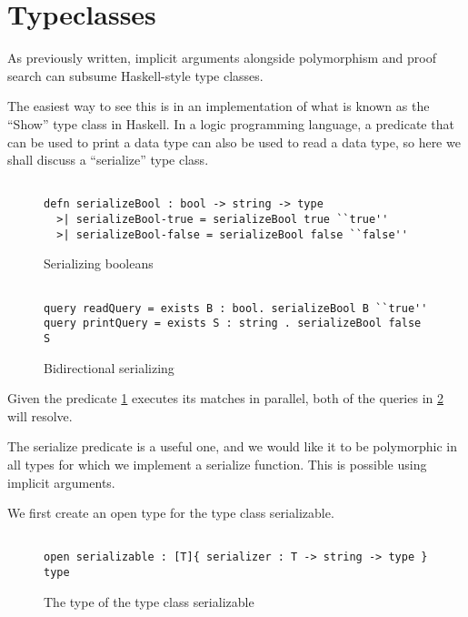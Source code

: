 \section{Typeclasses}


As previously written, implicit arguments alongside polymorphism and proof search can subsume Haskell-style type classes.

The easiest way to see this is in an implementation of what is known as the ``Show'' type class in Haskell.  
In a logic programming language, a predicate that can be used to print a data type can also be used to read a data type, so here we shall discuss a ``serialize'' type class.


\begin{figure}[H]
\begin{lstlisting}

defn serializeBool : bool -> string -> type
  >| serializeBool-true = serializeBool true ``true''
  >| serializeBool-false = serializeBool false ``false''

\end{lstlisting}
\caption{Serializing booleans}
\label{prog:serializing}
\end{figure}



\begin{figure}[H]
\begin{lstlisting}

query readQuery = exists B : bool. serializeBool B ``true''
query printQuery = exists S : string . serializeBool false S

\end{lstlisting}
\caption{Bidirectional serializing}
\label{prog:bidi}
\end{figure}

Given the predicate \ref{prog:serializing} executes its matches in parallel, both of the queries in 
\ref{prog:bidi} will resolve. 

The serialize predicate is a useful one, and we would like it to be polymorphic in all types
for which we implement a serialize function.  This is possible using implicit arguments.

We first create an open type for the type class serializable.

\begin{figure}[H]
\begin{lstlisting}

open serializable : [T]{ serializer : T -> string -> type } type

\end{lstlisting}
\caption{The type of the type class serializable }
\label{prog:sty}
\end{figure}

